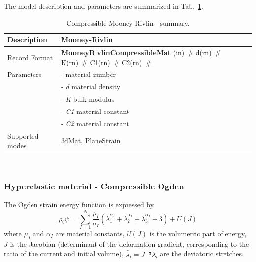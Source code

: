 \documentclass[a4paper]{article}
\newcommand{\descitem}[1]{{\noindent \bf #1}}
\newcommand{\elemparam}[2]{{{#1\tiny (#2)}~\#}}
\newcommand{\param}[1]{{\it #1}}
\newenvironment{mmt}{\begin{tabular}{|l|p{9cm}|}}{\end{tabular}\\}
\newenvironment{mmt}{\begin{tabular}{|l|l|}}{\end{tabular}\\}
\begin{document}
The model description and parameters are summarized in Tab.~\ref{MooneyRivlin_table}.
\begin{table}[!htb]
	\begin{mmt}
		\hline
		Description & Mooney-Rivlin\\
		\hline
		Record Format & \descitem{MooneyRivlinCompressibleMat}  \elemparam{}{in}
		\elemparam{d}{rn} \elemparam{K}{rn} \elemparam{C1}{rn} \elemparam{C2}{rn}\\
		Parameters &- \param{} material number\\
		&- \param{d} material density\\
		&- \param{K} bulk modulus\\
		&- \param{C1} material constant\\
		&- \param{C2} material constant\\
		Supported modes& 3dMat, PlaneStrain\\
		\hline
	\end{mmt}
	\caption{Compressible Mooney-Rivlin - summary.}
	\label{MooneyRivlin_table}
\end{table}




\subsubsection{Hyperelastic material - Compressible Ogden}
The Ogden strain energy function is expressed by
\begin{equation}\label{freeEnergyOgdenDeviatoricStretch}
\rho_0 \psi = \sum_{I=1}^N \frac{\mu_I}{\alpha_I} \left( \bar{\lambda}_1^{\alpha_I}+\bar{\lambda}_2^{\alpha_I}+\bar{\lambda}_3^{\alpha_I}-3\right)+ U(J)
\end{equation}
where $\mu_I$ and $\alpha_I$ are material constants, $U(J)$ is the volumetric part of energy, $J$ is the Jacobian (determinant of the deformation gradient, corresponding to the ratio of the current and initial volume),  $\bar{\lambda}_i = J^{-\frac{1}{3}} {\lambda}_i$ are the deviatoric stretches.
\end{document}
